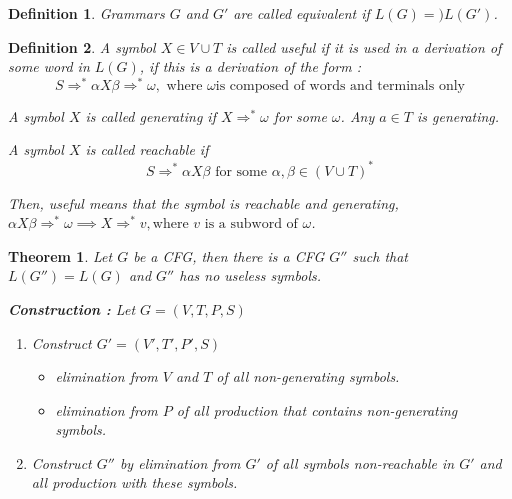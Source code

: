 \documentclass[a4paper,11pt]{article}
\newtheorem{mydef}{Definition}
\newtheorem{thm}{Theorem}[section]
\begin{document}
\begin{mydef}
  Grammars $G$ and $G'$ are called equivalent if $L(G) =) L(G')$.
\end{mydef}

\begin{mydef}
  A symbol $X \in V \cup T$ is called useful if it is used in a derivation of
  some word in $L(G)$, if this is a derivation of the form :
  \[ 
    S \Rightarrow^* \alpha X \beta \Rightarrow^* \omega, \text{ where $\omega$
      is composed of words and terminals only}
  \]
  
  A symbol $X$ is called generating if $X \Rightarrow^* \omega$ for some
  $\omega$. Any $a \in T$ is generating.

  A symbol $X$ is called reachable if
  \[
    S \Rightarrow^* \alpha X \beta \text{ for some }  \alpha,\beta \in (V \cup T)^*
  \]

  Then, useful means that the symbol is reachable and generating, $\alpha X
  \beta \Rightarrow^* \omega \implies X \Rightarrow^* v, \text{where $v$ is a
    subword of $\omega$}$.
\end{mydef}

\begin{thm}
  Let $G$ be a CFG, then there is a CFG $G''$ such that $L(G'') = L(G)$ and
  $G''$ has no useless symbols.

  \textbf{Construction : } Let $G = (V,T,P,S)$
  \begin{enumerate}
  \item Construct $G' = (V',T',P',S)$
    \begin{itemize}
    \item elimination from $V$ and $T$ of all non-generating symbols.
    \item elimination from $P$ of all production that contains non-generating symbols.
    \end{itemize}
  \item Construct $G''$ by elimination from $G'$ of all symbols non-reachable in
    $G'$ and all production with these symbols.
  \end{enumerate}
\end{thm}
\end{document}
